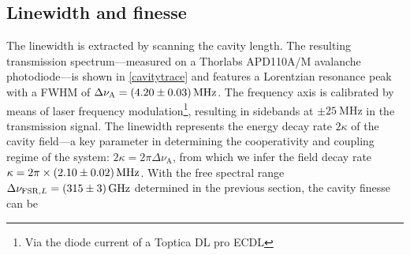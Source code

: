 \documentclass[../Thesis-IJspeert.tex]{subfiles}
\begin{document}
\subsection{Linewidth and finesse}
The linewidth is extracted by scanning the cavity length. The resulting transmission spectrum---measured on a Thorlabs APD110A/M avalanche photo\-diode---is shown in \autoref{cavitytrace} and features a Lorentzian resonance peak with a FWHM of $\Delta \nu_\mathrm{A} = \SI{4.20\pm0.03}{\mega\hertz}$. The frequency axis is calibrated by means of laser frequency modulation\footnote{Via the diode current of a Toptica DL pro ECDL}, resulting in sidebands at $\pm\SI{25}{\mega\hertz}$ in the transmission signal. The linewidth represents the energy decay rate $2\kappa$ of the cavity field---a key parameter in determining the cooperativity and coupling regime of the system: $2\kappa = 2\pi \Delta \nu_\mathrm{A}$, from which we infer the field decay rate $\kappa = 2\pi \times \SI{2.10\pm0.02}{\mega\hertz}$. With the free spectral range $\Delta\nu_{\mathrm{FSR},L} = \SI{315\pm3}{\giga\hertz}$ determined in the previous section, the cavity finesse can be
\end{document}
